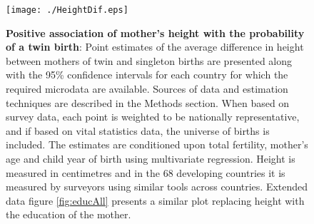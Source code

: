 \documentclass{nature}
\begin{document}
\begin{linenumbers}
\begin{spacing}{1}
\begin{figure}[htpb!]
  \texttt{[image: ./HeightDif.eps]}
\vspace{5mm}
\caption{\textbf{Positive association of mother's height with the probability of a twin birth}: {\footnotesize Point estimates of the average difference in height between mothers of twin and singleton births are presented along with the 95\% confidence intervals for each country for which the required microdata are available. Sources of data and estimation techniques are described in the Methods section. When based on survey data, each point is weighted to be nationally representative, and if based on vital statistics data, the universe of births is included. The estimates are conditioned upon total fertility, mother's age and child year of birth using multivariate regression. Height is measured in centimetres and in the 68 developing countries it is measured by surveyors using similar tools across countries. Extended data figure \ref{fig:educAll} presents a similar plot replacing height with the education of the mother.}}
\label{fig:countryEsts}
\end{figure}



\end{spacing}
\end{linenumbers}
\end{document}

